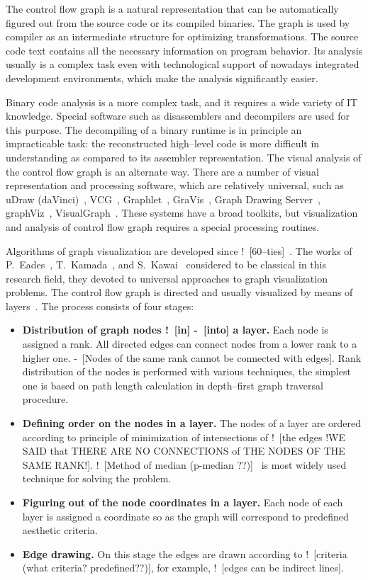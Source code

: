 \documentclass[conference]{IEEEtran}
\newcommand{\rrr}[2][rcolor]{\noindent%
\textcolor{eclr}{-\ [}\textcolor{#1}{#2}\textcolor{eclr}{]}}
\newcommand{\nnn}[2][ncolor]{\noindent%
\textcolor{eclr}{!\ [}\textcolor{#1}{#2}\textcolor{eclr}{]}}
\begin{document}
The control flow graph is a natural representation that can be automatically figured out from the source code or its compiled binaries.  The graph is used by compiler as an intermediate structure for optimizing transformations.  The source code text contains all the necessary information on program behavior.  Its analysis usually is a complex task even with technological support of nowadays integrated development environments, which make the analysis significantly easier.

Binary code analysis is a more complex task, and it requires a wide variety of IT knowledge.  Special software such as disassemblers and decompilers are used for this purpose.  The decompiling of a binary runtime is in principle an impracticable task: the reconstructed high--level code is more difficult in understanding as compared to its assembler representation.  The visual analysis of the control flow graph is an alternate way.  There are a number of visual representation and processing software, which are relatively universal, such as uDraw (daVinci)~\cite{10}, VCG~\cite{14}, Graphlet~\cite{12}, GraVis~\cite{13}, Graph Drawing Server~\cite{9}, graphViz~\cite{11}, VisualGraph~\cite{15}.  These systems have a broad toolkits, but visualization and analysis of control flow graph requires a special processing routines.

Algorithms of graph visualization are developed since \nnn{60--ties}~\cite{7}.  The works of P.~Eades~\cite{5}, T.~Kamada~\cite{q1}, and S.~Kawai~\cite{6} considered to be classical in this research field, they devoted to universal approaches to graph visualization problems.  The control flow graph is directed and usually visualized by means of layers~\cite{4}.  The process consists of four stages:
\begin{itemize}
\item \textbf{Distribution of graph nodes \nnn{in}\rrr{into} a layer.} Each node is assigned a rank.  All directed edges can connect nodes from a lower rank to a higher one.  \rrr{Nodes of the same rank cannot be connected with edges}.  Rank distribution of the nodes is performed with various techniques, the simplest one is based on path length calculation in depth--first graph traversal procedure.
\item \textbf{Defining order on the nodes in a layer.} The nodes of a layer are ordered according to principle of minimization of intersections of \nnn{the edges !WE SAID that THERE ARE NO CONNECTIONS of THE NODES OF THE SAME RANK!}.  \nnn{Method of median (p-median ??)}~\cite{8} is most widely used technique for solving the problem.
\item \textbf{Figuring out of the node coordinates in a layer.} Each node of each layer is assigned a coordinate so as the graph will correspond to predefined aesthetic criteria.
\item \textbf{Edge drawing.} On this stage the edges are drawn according to \nnn{criteria (what criteria? predefined??)}, for example, \nnn{edges can be indirect lines}.
\end{itemize}
\end{document}

